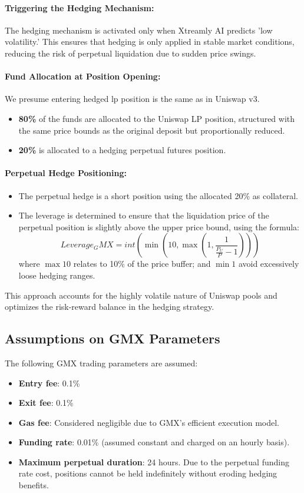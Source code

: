 \documentclass[12pt]{article}
\begin{document}
\paragraph{Triggering the Hedging Mechanism:} 
The hedging mechanism is activated only when Xtreamly AI predicts 'low volatility.' This ensures that hedging is only applied in stable market conditions, reducing the risk of perpetual liquidation due to sudden price swings.

\paragraph{Fund Allocation at Position Opening:} 
We presume entering hedged lp position is the same as in Uniswap v3.
\begin{itemize}
	\item \textbf{80\%} of the funds are allocated to the Uniswap LP position, structured with the same price bounds as the original deposit but proportionally reduced.
	\item \textbf{20\%} is allocated to a hedging perpetual futures position.
\end{itemize}

\paragraph{Perpetual Hedge Positioning:} 

\begin{itemize}
	\item The perpetual hedge is a short position using the allocated 20\% as collateral.
	\item The leverage is determined to ensure that the liquidation price of the perpetual position is slightly above the upper price bound, using the formula:
	$$Leverage_GMX = int(\min(10,\max(1,  \frac{1}{\frac{P_U}{P}-1})))$$
	where $\max 10$ relates to 10\% of the price buffer; and $\min 1$ avoid excessively loose hedging ranges.
\end{itemize}
This approach accounts for the highly volatile nature of Uniswap pools and optimizes the risk-reward balance in the hedging strategy. 

\subsection{Assumptions on GMX Parameters}
The following GMX trading parameters are assumed:
\begin{itemize}
	\item \textbf{Entry fee}: 0.1\%
	\item \textbf{Exit fee}: 0.1\%
	\item \textbf{Gas fee}: Considered negligible due to GMX's efficient execution model.
	\item \textbf{Funding rate}: 0.01\% (assumed constant and charged on an hourly basis).
	\item \textbf{Maximum perpetual duration}: 24 hours. Due to the perpetual funding rate cost, positions cannot be held indefinitely without eroding hedging benefits.	
\end{itemize}
\end{document}
